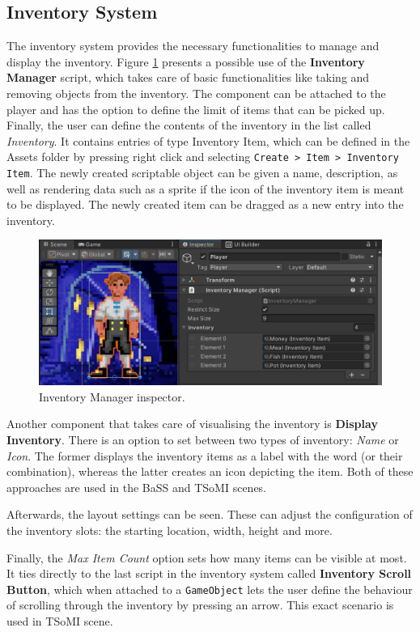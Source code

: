 
\subsection{Inventory System}
The inventory system provides the necessary functionalities to manage and display the inventory. Figure \ref{fig:Manual-Inventory} presents a possible use of the \textbf{Inventory Manager} script, which takes care of basic functionalities like taking and removing objects from the inventory. The component can be attached to the player and has the option to define the limit of items that can be picked up. Finally, the user can define the contents of the inventory in the list called \textit{Inventory}. It contains entries of type Inventory Item, which can be defined in the Assets folder by pressing right click and selecting \verb|Create > Item > Inventory Item|. The newly created scriptable object can be given a name, description, as well as rendering data such as a sprite if the icon of the inventory item is meant to be displayed. The newly created item can be dragged as a new entry into the inventory.
\begin{figure}[H]
\centering
\includegraphics[width=.8\linewidth]{img/User doc/inventory.png}
\caption{Inventory Manager inspector.}
\label{fig:Manual-Inventory}
\end{figure}

Another component that takes care of visualising the inventory is \textbf{Display Inventory}. There is an option to set between two types of inventory: \textit{Name} or \textit{Icon}. The former displays the inventory items as a label with the word (or their combination), whereas the latter creates an icon depicting the item. Both of these approaches are used in the BaSS and TSoMI scenes.

Afterwards, the layout settings can be seen. These can adjust the configuration of the inventory slots: the starting location, width, height and more. 

Finally, the \textit{Max Item Count} option sets how many items can be visible at most. It ties directly to the last script in the inventory system called \textbf{Inventory Scroll Button}, which when attached to a \verb|GameObject| lets the user define the behaviour of scrolling through the inventory by pressing an arrow. This exact scenario is used in TSoMI scene.

